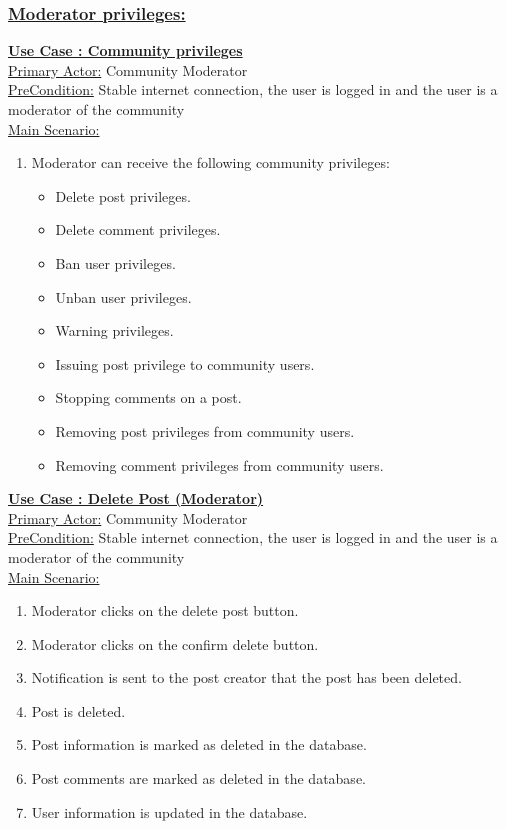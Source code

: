 \documentclass[conference,compsoc]{IEEEtran}
\newcounter{UC}
\newcommand{\nextU}{\stepcounter{UC}\theUC}
\begin{document}
\subsubsection{\underline{Moderator privileges:}}

\underline{\textbf{Use Case \nextU: Community privileges}}\\

\underline{Primary Actor:} Community Moderator\\

\underline{PreCondition:} Stable internet connection, the user is logged in and the user is a moderator of the community\\

\underline{Main Scenario:}\\
\begin{enumerate}
    \item Moderator can receive the following community privileges:
          \begin{itemize}
              \item Delete post privileges.
              \item Delete comment privileges.
              \item Ban user privileges.
              \item Unban user privileges.
              \item Warning privileges.
              \item Issuing post privilege to community users.
              \item Stopping comments on a post.
              \item Removing post privileges from community users.
              \item Removing comment privileges from community users.
          \end{itemize}
\end{enumerate}

\underline{\textbf{Use Case \nextU: Delete Post (Moderator)}}\\

\underline{Primary Actor:} Community Moderator\\

\underline{PreCondition:} Stable internet connection, the user is logged in and the user is a moderator of the community\\

\underline{Main Scenario:}\\
\begin{enumerate}
    \item Moderator clicks on the delete post button.
    \item Moderator clicks on the confirm delete button.
    \item Notification is sent to the post creator that the post has been deleted.
    \item Post is deleted.
    \item Post information is marked as deleted in the database.
    \item Post comments are marked as deleted in the database.
    \item User information is updated in the database.
\end{enumerate}
\end{document}
